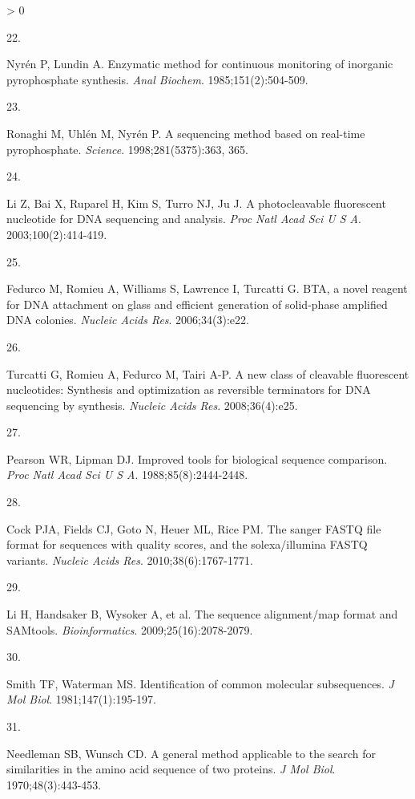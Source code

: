 \documentclass[11pt,letterpaper,oneside]{book}
\newlength{\cslhangindent}
\newlength{\csllabelwidth}
\newenvironment{CSLReferences}[3] %
 {%
  \setlength{\parindent}{0pt}
  \ifodd #1 \everypar{\setlength{\hangindent}{\cslhangindent}}\ignorespaces\fi
  \ifnum #2 > 0
  \setlength{\parskip}{#2\baselineskip}
  \fi
 }%
 {}
\newcommand{\CSLLeftMargin}[1]{\parbox[t]{\maxof{\widthof{#1}}{\csllabelwidth}}{#1}}
\newcommand{\CSLRightInline}[1]{\parbox[t]{\linewidth-\csllabelwidth}{#1}\newline}
\begin{document}
\begin{CSLReferences}{0}{0}
\leavevmode\hypertarget{ref-nyren:1985aa}{}%
\CSLLeftMargin{22. }
\CSLRightInline{Nyrén P, Lundin A. Enzymatic method for continuous monitoring of inorganic pyrophosphate synthesis. \emph{Anal Biochem}. 1985;151(2):504-509.}

\leavevmode\hypertarget{ref-ronaghi:1998aa}{}%
\CSLLeftMargin{23. }
\CSLRightInline{Ronaghi M, Uhlén M, Nyrén P. A sequencing method based on real-time pyrophosphate. \emph{Science}. 1998;281(5375):363, 365.}

\leavevmode\hypertarget{ref-li:2003aa}{}%
\CSLLeftMargin{24. }
\CSLRightInline{Li Z, Bai X, Ruparel H, Kim S, Turro NJ, Ju J. A photocleavable fluorescent nucleotide for DNA sequencing and analysis. \emph{Proc Natl Acad Sci U S A}. 2003;100(2):414-419.}

\leavevmode\hypertarget{ref-fedurco:2006aa}{}%
\CSLLeftMargin{25. }
\CSLRightInline{Fedurco M, Romieu A, Williams S, Lawrence I, Turcatti G. BTA, a novel reagent for DNA attachment on glass and efficient generation of solid-phase amplified DNA colonies. \emph{Nucleic Acids Res}. 2006;34(3):e22.}

\leavevmode\hypertarget{ref-turcatti:2008aa}{}%
\CSLLeftMargin{26. }
\CSLRightInline{Turcatti G, Romieu A, Fedurco M, Tairi A-P. A new class of cleavable fluorescent nucleotides: Synthesis and optimization as reversible terminators for DNA sequencing by synthesis. \emph{Nucleic Acids Res}. 2008;36(4):e25.}

\leavevmode\hypertarget{ref-pearson:1988aa}{}%
\CSLLeftMargin{27. }
\CSLRightInline{Pearson WR, Lipman DJ. Improved tools for biological sequence comparison. \emph{Proc Natl Acad Sci U S A}. 1988;85(8):2444-2448.}

\leavevmode\hypertarget{ref-cock:2010aa}{}%
\CSLLeftMargin{28. }
\CSLRightInline{Cock PJA, Fields CJ, Goto N, Heuer ML, Rice PM. The sanger FASTQ file format for sequences with quality scores, and the solexa/illumina FASTQ variants. \emph{Nucleic Acids Res}. 2010;38(6):1767-1771.}

\leavevmode\hypertarget{ref-li:2009aa}{}%
\CSLLeftMargin{29. }
\CSLRightInline{Li H, Handsaker B, Wysoker A, et al. The sequence alignment/map format and SAMtools. \emph{Bioinformatics}. 2009;25(16):2078-2079.}

\leavevmode\hypertarget{ref-smith:1981aa}{}%
\CSLLeftMargin{30. }
\CSLRightInline{Smith TF, Waterman MS. Identification of common molecular subsequences. \emph{J Mol Biol}. 1981;147(1):195-197.}

\leavevmode\hypertarget{ref-needleman:1970aa}{}%
\CSLLeftMargin{31. }
\CSLRightInline{Needleman SB, Wunsch CD. A general method applicable to the search for similarities in the amino acid sequence of two proteins. \emph{J Mol Biol}. 1970;48(3):443-453.}


\end{CSLReferences}
\end{document}
